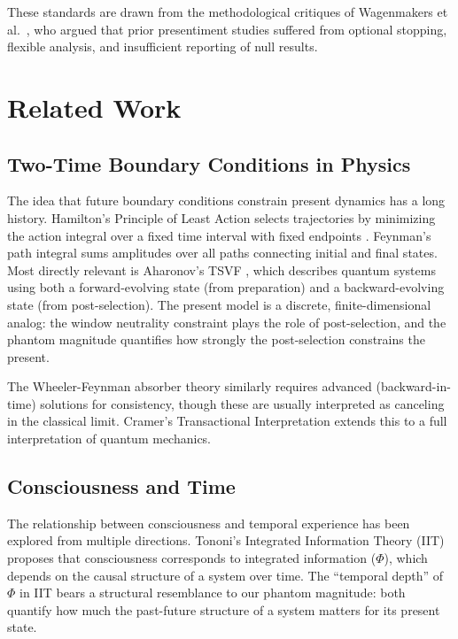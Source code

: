 \documentclass[11pt, a4paper]{article}
\theoremstyle{definition}
\theoremstyle{remark}
\begin{document}
These standards are drawn from the methodological critiques of
Wagenmakers et al.\ \cite{Wagenmakers2012}, who argued that prior
presentiment studies suffered from optional stopping, flexible
analysis, and insufficient reporting of null results.


\section{Related Work}\label{sec:related}

\subsection{Two-Time Boundary Conditions in Physics}

The idea that future boundary conditions constrain present dynamics
has a long history. Hamilton's Principle of Least Action selects
trajectories by minimizing the action integral over a fixed time
interval with fixed endpoints \cite{Lanczos1970}. Feynman's path
integral sums amplitudes over all paths connecting initial and final
states. Most directly relevant is Aharonov's TSVF
\cite{Aharonov1964,Aharonov2008}, which describes quantum systems
using both a forward-evolving state (from preparation) and a
backward-evolving state (from post-selection). The present model is
a discrete, finite-dimensional analog: the window neutrality
constraint plays the role of post-selection, and the phantom
magnitude quantifies how strongly the post-selection constrains
the present.

The Wheeler-Feynman absorber theory \cite{WheelerFeynman1945}
similarly requires advanced (backward-in-time) solutions for
consistency, though these are usually interpreted as canceling in
the classical limit. Cramer's Transactional Interpretation
\cite{Cramer1986} extends this to a full interpretation of quantum
mechanics.

\subsection{Consciousness and Time}

The relationship between consciousness and temporal experience has
been explored from multiple directions. Tononi's Integrated
Information Theory (IIT) \cite{Tononi2004} proposes that
consciousness corresponds to integrated information ($\Phi$), which
depends on the causal structure of a system over time. The ``temporal
depth'' of $\Phi$ in IIT bears a structural resemblance to our
phantom magnitude: both quantify how much the past-future structure
of a system matters for its present state.
\end{document}
